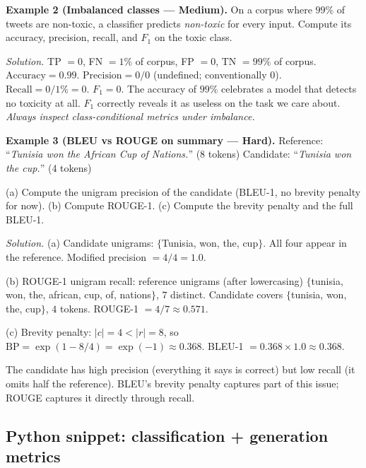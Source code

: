 \documentclass[12pt,a4paper]{report}
\theoremstyle{definition}
\theoremstyle{remark}
\begin{document}
\medskip

\textbf{Example 2 (Imbalanced classes --- Medium).}
On a corpus where $99\%$ of tweets are non-toxic, a classifier predicts \emph{non-toxic} for every input. Compute its accuracy, precision, recall, and $F_1$ on the toxic class.

\textit{Solution.} TP $= 0$, FN $= 1\%$ of corpus, FP $= 0$, TN $= 99\%$ of corpus.
$\mathrm{Accuracy} = 0.99$. $\mathrm{Precision} = 0/0$ (undefined; conventionally $0$). $\mathrm{Recall} = 0/1\% = 0$. $F_1 = 0$.
The accuracy of $99\%$ celebrates a model that detects no toxicity at all. $F_1$ correctly reveals it as useless on the task we care about. \emph{Always inspect class-conditional metrics under imbalance.}

\medskip

\textbf{Example 3 (BLEU vs ROUGE on summary --- Hard).}
Reference: ``\emph{Tunisia won the African Cup of Nations.}'' (8 tokens)
Candidate: ``\emph{Tunisia won the cup.}'' (4 tokens)

(a) Compute the unigram precision of the candidate (BLEU-1, no brevity penalty for now).
(b) Compute ROUGE-1.
(c) Compute the brevity penalty and the full BLEU-1.

\textit{Solution.}
(a) Candidate unigrams: $\{$Tunisia, won, the, cup$\}$. All four appear in the reference. Modified precision $= 4/4 = 1.0$.

(b) ROUGE-1 unigram recall: reference unigrams (after lowercasing) $\{$tunisia, won, the, african, cup, of, nations$\}$, $7$ distinct. Candidate covers $\{$tunisia, won, the, cup$\}$, $4$ tokens. ROUGE-1 $= 4/7 \approx 0.571$.

(c) Brevity penalty: $|c| = 4 < |r| = 8$, so $\mathrm{BP} = \exp(1 - 8/4) = \exp(-1) \approx 0.368$. BLEU-1 $= 0.368 \times 1.0 \approx 0.368$.

The candidate has high precision (everything it says is correct) but low recall (it omits half the reference). BLEU's brevity penalty captures part of this issue; ROUGE captures it directly through recall.

\subsection{Python snippet: classification + generation metrics}
\end{document}
